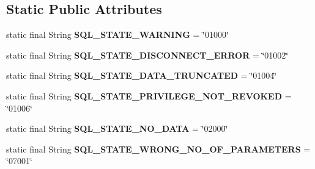 \subsection*{Static Public Attributes}
\begin{DoxyCompactItemize}
\item 
\mbox{\label{classcom_1_1mysql_1_1jdbc_1_1_s_q_l_error_a6d4c3637ce2fc47db8a3d4062814ed59}} 
static final String {\bfseries S\+Q\+L\+\_\+\+S\+T\+A\+T\+E\+\_\+\+W\+A\+R\+N\+I\+NG} = \char`\"{}01000\char`\"{}
\item 
\mbox{\label{classcom_1_1mysql_1_1jdbc_1_1_s_q_l_error_a5a7ca482eb983caa54b434c1660dc46c}} 
static final String {\bfseries S\+Q\+L\+\_\+\+S\+T\+A\+T\+E\+\_\+\+D\+I\+S\+C\+O\+N\+N\+E\+C\+T\+\_\+\+E\+R\+R\+OR} = \char`\"{}01002\char`\"{}
\item 
\mbox{\label{classcom_1_1mysql_1_1jdbc_1_1_s_q_l_error_a698c64c523370d37fe0fe4227ec1166c}} 
static final String {\bfseries S\+Q\+L\+\_\+\+S\+T\+A\+T\+E\+\_\+\+D\+A\+T\+A\+\_\+\+T\+R\+U\+N\+C\+A\+T\+ED} = \char`\"{}01004\char`\"{}
\item 
\mbox{\label{classcom_1_1mysql_1_1jdbc_1_1_s_q_l_error_a68e789153615e6f82e629c52c45482f8}} 
static final String {\bfseries S\+Q\+L\+\_\+\+S\+T\+A\+T\+E\+\_\+\+P\+R\+I\+V\+I\+L\+E\+G\+E\+\_\+\+N\+O\+T\+\_\+\+R\+E\+V\+O\+K\+ED} = \char`\"{}01006\char`\"{}
\item 
\mbox{\label{classcom_1_1mysql_1_1jdbc_1_1_s_q_l_error_a08ef0dfb4a918c9c0380bc513ed12977}} 
static final String {\bfseries S\+Q\+L\+\_\+\+S\+T\+A\+T\+E\+\_\+\+N\+O\+\_\+\+D\+A\+TA} = \char`\"{}02000\char`\"{}
\item 
\mbox{\label{classcom_1_1mysql_1_1jdbc_1_1_s_q_l_error_afb7a2a7588e88307c783f5e62000aa24}} 
static final String {\bfseries S\+Q\+L\+\_\+\+S\+T\+A\+T\+E\+\_\+\+W\+R\+O\+N\+G\+\_\+\+N\+O\+\_\+\+O\+F\+\_\+\+P\+A\+R\+A\+M\+E\+T\+E\+RS} = \char`\"{}07001\char`\"{}
\item 
\mbox{\label{classcom_1_1mysql_1_1jdbc_1_1_s_q_l_error_a8e77be931f64c061d858b99456f74b1f}} 

\end{DoxyCompactItemize}
